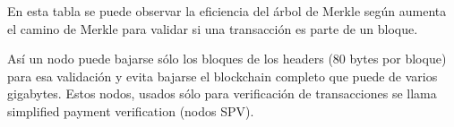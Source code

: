En esta tabla se puede observar la eficiencia del \'arbol de Merkle seg\'un aumenta el camino de Merkle para validar si una transacci\'on es parte de un bloque.

As\'i un nodo puede bajarse s\'olo los bloques de los headers (80 bytes por bloque) para esa validaci\'on y evita bajarse el blockchain completo que puede de varios gigabytes. Estos nodos, usados s\'olo para verificaci\'on de transacciones se llama simplified payment verification (nodos SPV). 







